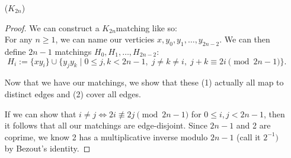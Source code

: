 \documentclass[11pt]{article}
\newcommand{\n}{\vspace{0.3cm}}
\begin{document}
\begin{itemize}
\begin{enumerate}[label=(\alph*)]
\begin{enumerate}[label=(\roman*)]
\begin{itemize}
\begin{proof}
                  Now assume \(K_{(n-1),(n-1)}\) has 1-factorization, we show \(K_{n,n}\) does as well.  Let \((X,Y)\) be our bipartition of \(K_{n,n}\), \(X = \{x_1, x_2, \hdots, x_n\}\), \(Y = \{y_1, y_2, \hdots, y_n\}\).  Take arbitrary \(S \subseteq X\), we show that it's neighbor set always contains at least as many elements as \(S\), that is \(|S| \leq |N(S)|\).
                  \begin{align*}
                    |\{xy \colon x \in S, y \in N(S)\}| &= \sum_{x \in S} d_G(x) = d \cdot |S| \\
                                                      &= \sum_{y \in N(S)} |\{xy \colon x \in S\}| \leq \sum_{y \in N(S)} d_G(y) = d \cdot |N(S)|
                  \end{align*}
                  From the above inequalities, we see that \(|S| \leq |N(S)|\), thus we can apply Hall's theorem to conclude that there exists a matching \(M\) that saturates each \(x \in X\).  Finally, since \(|X| = |Y|\), we know that this matching is perfect, so \(M\) is a 1-factor.  \n

                  Since we have 1-factor \(M\), and \(K_{n,n} \setminus M = K_{(n-1),(n-1)}\) has edge-disjoint 1-factors \(H_1, H_2, \hdots, H_{n-1}\), we now have that \(K_{n,n}\) has 1-factorization \(H_1, H_2, \hdots, H_{n-1}, M\), and is thus 1-factorable.
                \end{proof}

              \item[(\(K_{2n}\))]  
                \begin{proof}
                  We can construct a \(K_{2n}\)matching like so: \\
                  For any \(n \geq 1\), we can name our verticies \(x, y_0, y_1, \hdots, y_{2n-2}\).  We can then define \(2n-1\) matchings \(H_0, H_1, \hdots, H_{2n-2}\):
                  \[H_i := \{xy_i\} \cup \{y_jy_k \mid 0 \leq j,k < 2n-1, \; j \neq k \neq i, \; j+k \equiv 2i \pmod{2n-1}\}.\]

                  Now that we have our matchings, we show that these (1) actually all map to distinct edges and (2) cover all edges. \n

                  If we can show that \(i \neq j \iff 2i \not\equiv 2j \pmod{2n-1}\) for \(0 \leq i,j < 2n-1\), then it follows that all our matchings are edge-disjoint.  Since \(2n-1\) and 2 are coprime, we know 2 has a multiplicative inverse modulo \(2n-1\) (call it \(2^{-1})\) by Bezout's identity. \n


\end{proof}
\end{itemize}
\end{enumerate}
\end{enumerate}
\end{itemize}
\end{document}
